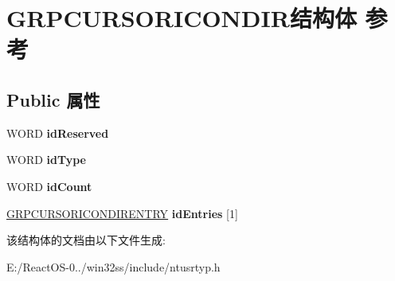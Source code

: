 \hypertarget{struct_g_r_p_c_u_r_s_o_r_i_c_o_n_d_i_r}{}\section{G\+R\+P\+C\+U\+R\+S\+O\+R\+I\+C\+O\+N\+D\+I\+R结构体 参考}
\label{struct_g_r_p_c_u_r_s_o_r_i_c_o_n_d_i_r}
\subsection*{Public 属性}
\begin{DoxyCompactItemize}
\item 
\mbox{\label{struct_g_r_p_c_u_r_s_o_r_i_c_o_n_d_i_r_a85773f40ebd62d539248a4d6e6a6b77d}} 
W\+O\+RD {\bfseries id\+Reserved}
\item 
\mbox{\label{struct_g_r_p_c_u_r_s_o_r_i_c_o_n_d_i_r_a55d679733e60b1aa375585106b4e455b}} 
W\+O\+RD {\bfseries id\+Type}
\item 
\mbox{\label{struct_g_r_p_c_u_r_s_o_r_i_c_o_n_d_i_r_a62cb2538428d680805744b7f4cfa14c8}} 
W\+O\+RD {\bfseries id\+Count}
\item 
\mbox{\label{struct_g_r_p_c_u_r_s_o_r_i_c_o_n_d_i_r_ad03724931a4ae9bca299a1d23639e854}} 
\hyperlink{struct_g_r_p_c_u_r_s_o_r_i_c_o_n_d_i_r_e_n_t_r_y}{G\+R\+P\+C\+U\+R\+S\+O\+R\+I\+C\+O\+N\+D\+I\+R\+E\+N\+T\+RY} {\bfseries id\+Entries} \mbox{[}1\mbox{]}
\end{DoxyCompactItemize}


该结构体的文档由以下文件生成\+:\begin{DoxyCompactItemize}
\item 
E\+:/\+React\+O\+S-\/0../win32ss/include/ntusrtyp.\+h\end{DoxyCompactItemize}
